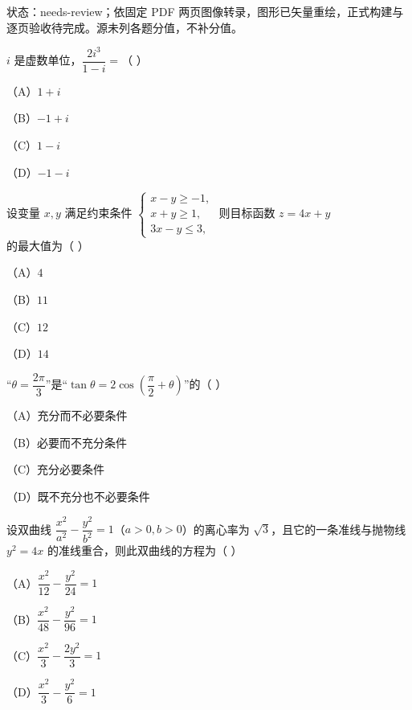 

状态：needs-review；依固定 PDF 两页图像转录，图形已矢量重绘，正式构建与逐页验收待完成。源未列各题分值，不补分值。


\begin{question}
$i$ 是虚数单位，$\dfrac{2i^3}{1-i}=$（ ）

（A）$1+i$

（B）$-1+i$

（C）$1-i$

（D）$-1-i$

\end{question}
\begin{question}
设变量 $x,y$ 满足约束条件 $\begin{cases}x-y\geqslant -1,\\ x+y\geqslant 1,\\ 3x-y\leqslant 3,\end{cases}$ 则目标函数 $z=4x+y$ 的最大值为（ ）

（A）$4$

（B）$11$

（C）$12$

（D）$14$

\end{question}
\begin{question}
“$\theta=\dfrac{2\pi}{3}$”是“$\tan\theta=2\cos\left(\dfrac{\pi}{2}+\theta\right)$”的（ ）

（A）充分而不必要条件

（B）必要而不充分条件

（C）充分必要条件

（D）既不充分也不必要条件

\end{question}
\begin{question}
设双曲线 $\dfrac{x^2}{a^2}-\dfrac{y^2}{b^2}=1$（$a>0,b>0$）的离心率为 $\sqrt{3}$，且它的一条准线与抛物线 $y^2=4x$ 的准线重合，则此双曲线的方程为（ ）

（A）$\dfrac{x^2}{12}-\dfrac{y^2}{24}=1$

（B）$\dfrac{x^2}{48}-\dfrac{y^2}{96}=1$

（C）$\dfrac{x^2}{3}-\dfrac{2y^2}{3}=1$

（D）$\dfrac{x^2}{3}-\dfrac{y^2}{6}=1$

\end{question}
